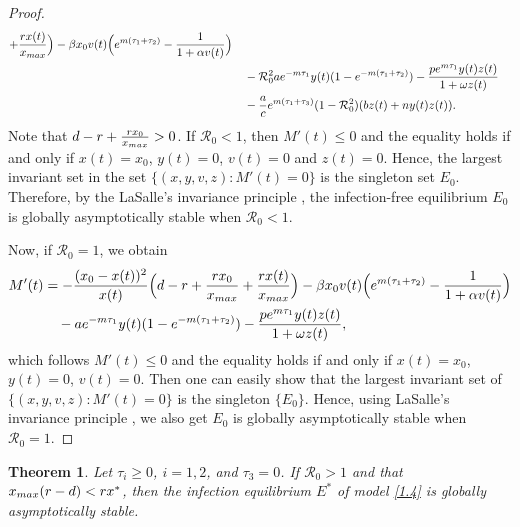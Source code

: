 \documentclass[10pt,a4paper]{amsart}
\numberwithin{equation}{section}
\newtheorem{theorem}{Theorem}[section]
\begin{document}
\begin{proof}
\begin{align*}
 +\frac{rx(t)}{x_{\rm max}}\Big)-\beta x_0v(t)\Big(e^{m(\tau_1+\tau_2)}
 -\frac{1}{1+\alpha v(t)}\Big)\\
&\quad -\mathcal{R}_0^{2}ae^{-m\tau_1}y(t)(1-e^{-m(\tau_1+\tau_2)})
 -\frac{pe^{m\tau_{1}} y(t)z(t)}{1+\omega z(t)}\\
&\quad -\frac{a}{c}e^{m(\tau_1+\tau_3)}(1-\mathcal{R}_0^{2})(bz(t)+ny(t)z(t)).
\end{align*}
Note that $d-r+\frac{rx_0}{x_{\rm max}}>0$. 
If $\mathcal{R}_0<1$, then $M'(t)\leqslant0$ and the equality holds if and only if 
 $x(t)=x_0$, $y(t)=0$, $v(t)=0$ and $z(t)=0$. 
Hence, the largest invariant set in the set $\{(x,y,v,z)\!: M'(t)=0\}$
is the singleton set $E_0$. Therefore, by the LaSalle's invariance 
principle \cite{HV}, the infection-free equilibrium $E_0$ is
globally asymptotically stable when $\mathcal{R}_0<1$.

Now, if $\mathcal{R}_0=1$, we obtain
\begin{align*}
M'(t)
&= -\frac{(x_0-x(t))^{2}}{x(t)}\Big(d-r+\frac{rx_0}{x_{\rm max}}
 +\frac{rx(t)}{x_{\rm max}}\Big)-\beta x_0v(t)\Big(e^{m(\tau_1+\tau_2)}
 -\frac{1}{1+\alpha v(t)}\Big)\\
&\quad -ae^{-m\tau_1}y(t)(1-e^{-m(\tau_1+\tau_2)})
 -\frac{pe^{m\tau_{1}} y(t)z(t)}{1+\omega z(t)},
\end{align*}
which follows $M'(t)\leqslant0$ and the equality holds if and only if  $x(t)=x_0$, 
$y(t)=0$, $v(t)=0$. Then one can easily show that the largest invariant set of
$\{(x,y,v,z): M'(t)=0\}$ is the singleton $\{E_0\}$. Hence, using LaSalle's 
invariance principle \cite{HV}, we also get $E_0$ is globally asymptotically
stable when $\mathcal{R}_0=1$.
\end{proof}


\begin{theorem}\label{T3.4}
Let $\tau_{i}\geqslant0$, $i=1,2$, and $\tau_3=0$.  If $\mathcal{R}_0> 1$ and that 
$x_{\rm max}(r-d)<rx^{*}$, then the infection equilibrium $E^{*}$ of model 
\eqref{1.4} is globally asymptotically stable.
\end{theorem}
\end{document}
